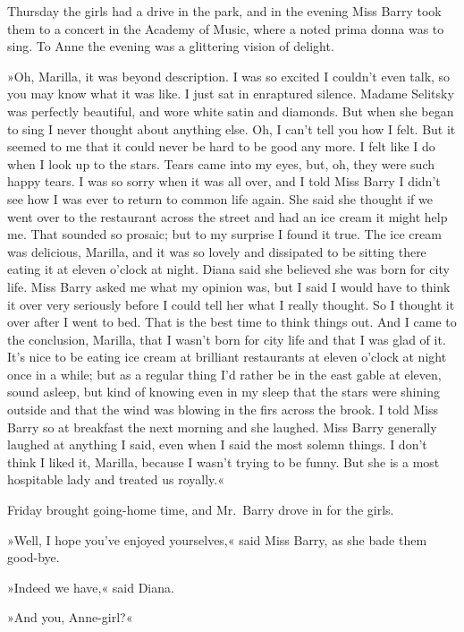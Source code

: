Thursday the girls had a drive in the park, and in the evening Miss Barry took them to a concert in the Academy of Music, where a noted prima donna was to sing. To Anne the evening was a glittering vision of delight.

»Oh, Marilla, it was beyond description. I was so excited I couldn't even talk, so you may know what it was like. I just sat in enraptured silence. Madame Selitsky was perfectly beautiful, and wore white satin and diamonds. But when she began to sing I never thought about anything else. Oh, I can't tell you how I felt. But it seemed to me that it could never be hard to be good any more. I felt like I do when I look up to the stars. Tears came into my eyes, but, oh, they were such happy tears. I was so sorry when it was all over, and I told Miss Barry I didn't see how I was ever to return to common life again. She said she thought if we went over to the restaurant across the street and had an ice cream it might help me. That sounded so prosaic; but to my surprise I found it true. The ice cream was delicious, Marilla, and it was so lovely and dissipated to be sitting there eating it at eleven o'clock at night. Diana said she believed she was born for city life. Miss Barry asked me what my opinion was, but I said I would have to think it over very seriously before I could tell her what I really thought. So I thought it over after I went to bed. That is the best time to think things out. And I came to the conclusion, Marilla, that I wasn't born for city life and that I was glad of it. It's nice to be eating ice cream at brilliant restaurants at eleven o'clock at night once in a while; but as a regular thing I'd rather be in the east gable at eleven, sound asleep, but kind of knowing even in my sleep that the stars were shining outside and that the wind was blowing in the firs across the brook. I told Miss Barry so at breakfast the next morning and she laughed. Miss Barry generally laughed at anything I said, even when I said the most solemn things. I don't think I liked it, Marilla, because I wasn't trying to be funny. But she is a most hospitable lady and treated us royally.«

Friday brought going-home time, and Mr.~Barry drove in for the girls.

»Well, I hope you've enjoyed yourselves,« said Miss Barry, as she bade them good-bye.

»Indeed we have,« said Diana.

»And you, Anne-girl?«

